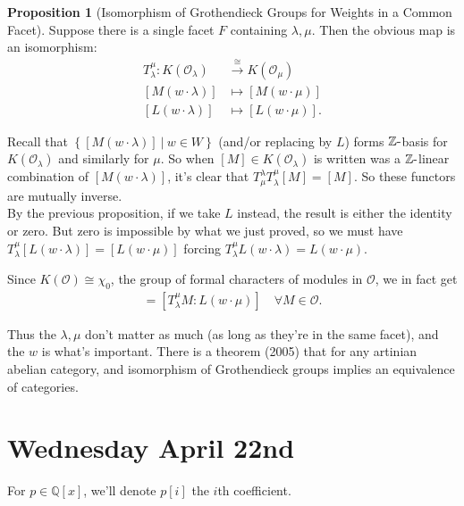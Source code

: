 \documentclass[11pt]{scrartcl}
\theoremstyle{definition}
\theoremstyle{theorem}
\newtheorem{proposition}[theorem]{Proposition}
\theoremstyle{proof}
\newenvironment{proof}
{\pushQED{$\qed$}\pf}
{\par\popQED\endpf}
\theoremstyle{definition}
\theoremstyle{break}
\theoremstyle{problem}
\newcommand{\QQ}[0]{{\mathbb{Q}}}
\newcommand{\ZZ}[0]{{\mathbb{Z}}}
\newcommand{\dash}[0]{{\hbox{-}}}
\newcommand{\mapsvia}[1]{\xrightarrow{#1}}
\newcommand{\OO}[0]{{\mathcal{O}}}
\newcommand{\suchthat}[0]{{~\mathrel{\Big|}~}}
\newcommand{\theset}[1]{\left\{{#1}\right\}}
\renewcommand{\qed}[0]{\hfill\blacksquare}
\begin{document}
\begin{proposition}[Isomorphism of Grothendieck Groups for Weights in a Common Facet]

Suppose there is a single facet \(F\) containing \(\lambda, \mu\). Then
the obvious map is an isomorphism: \begin{align*}
T_\lambda^\mu: K(\OO_\lambda) &\mapsvia\cong K(\OO_\mu)\\
[M(w\cdot \lambda)] &\mapsto [M(w\cdot \mu)] \\
[L(w\cdot \lambda)] &\mapsto [L(w\cdot \mu)]
.\end{align*}\end{proposition}

\begin{proof}

Recall that \(\theset{[M(w\cdot \lambda)] \suchthat w\in W}\) (and/or
replacing by \(L\)) forms \(\ZZ\dash\)basis for \(K(\OO_\lambda)\) and
similarly for \(\mu\). So when \([M]\in K(\OO_\lambda)\) is written was
a \(\ZZ\dash\)linear combination of \([M(w\cdot \lambda)]\), it's clear
that \(T_\mu^\lambda T_\lambda^\mu [M] = [M]\). So these functors are
mutually inverse.\\
By the previous proposition, if we take \(L\) instead, the result is
either the identity or zero. But zero is impossible by what we just
proved, so we must have
\(T_\lambda^\mu [ L(w\cdot \lambda)] = [L(w\cdot \mu)]\) forcing
\(T_\lambda^\mu L(w\cdot \lambda) = L(w\cdot \mu)\).\end{proof}

Since \(K(\OO) \cong \chi_0\), the group of formal characters of modules
in \(\OO\), we in fact get \begin{align*}
[M: L(w\cdot \lambda)] = [T_\lambda^\mu M: L(w\cdot \mu)] \quad \forall M\in \OO
.\end{align*}

Thus the \(\lambda, \mu\) don't matter as much (as long as they're in
the same facet), and the \(w\) is what's important. There is a theorem
(2005) that for any artinian abelian category, and isomorphism of
Grothendieck groups implies an equivalence of categories.

\hypertarget{wednesday-april-22nd}{%
\section{Wednesday April 22nd}\label{wednesday-april-22nd}}

For \(p\in \QQ[x]\), we'll denote \(p[i]\) the \(i\)th coefficient.
\end{document}
